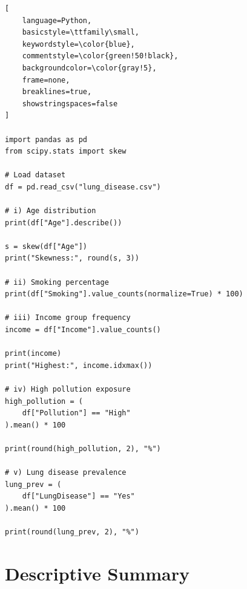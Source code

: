 \documentclass[12pt,a4paper]{report}
\begin{document}
\begin{tcolorbox}[
    enhanced,
    colback=blue!3,
    colframe=blue!70!black,
    title=Basic EDA Analysis Code,
    fonttitle=\bfseries,
    coltitle=white,
    colbacktitle=blue!70!black,
    arc=4pt,
    boxrule=1pt,
    breakable
]

\begin{lstlisting}[
    language=Python,
    basicstyle=\ttfamily\small,
    keywordstyle=\color{blue},
    commentstyle=\color{green!50!black},
    backgroundcolor=\color{gray!5},
    frame=none,
    breaklines=true,
    showstringspaces=false
]

import pandas as pd
from scipy.stats import skew

# Load dataset
df = pd.read_csv("lung_disease.csv")

# i) Age distribution
print(df["Age"].describe())

s = skew(df["Age"])
print("Skewness:", round(s, 3))

# ii) Smoking percentage
print(df["Smoking"].value_counts(normalize=True) * 100)

# iii) Income group frequency
income = df["Income"].value_counts()

print(income)
print("Highest:", income.idxmax())

# iv) High pollution exposure
high_pollution = (
    df["Pollution"] == "High"
).mean() * 100

print(round(high_pollution, 2), "%")

# v) Lung disease prevalence
lung_prev = (
    df["LungDisease"] == "Yes"
).mean() * 100

print(round(lung_prev, 2), "%")

\end{lstlisting}

\end{tcolorbox}

\section*{Descriptive Summary}
\end{document}
